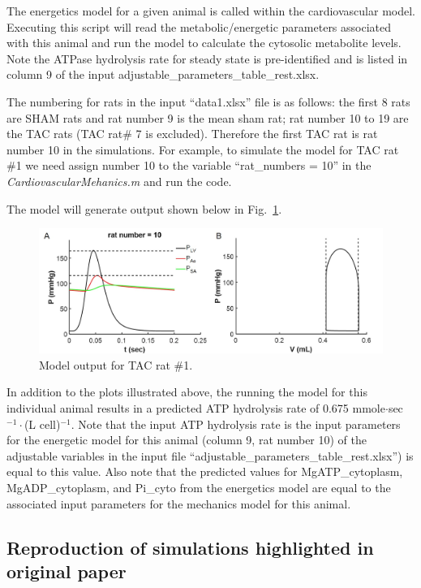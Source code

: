 \documentclass[fleqn,10pt]{physiome}
\begin{document}
The energetics model for a given animal is called within the cardiovascular model. Executing this script will read the metabolic/energetic parameters associated with this animal and run the model to calculate the cytosolic metabolite levels. Note the ATPase hydrolysis rate for steady state is pre-identified and is listed in column 9 of the input adjustable\_parameters\_table\_rest.xlsx. 

The numbering for rats in the input ``data1.xlsx'' file is as follows: the first 8 rats are SHAM rats and rat number 9 is the mean sham rat; rat number 10 to 19 are the TAC rats (TAC rat\# 7 is excluded). Therefore the first TAC rat is rat number 10 in the simulations. For example, to simulate the model for TAC rat \#1 we need assign number 10 to the variable ``rat\_numbers = 10'' in the {\em CardiovascularMehanics.m} and run the code. 

The model will generate output shown below in Fig.~\ref{fig:output}. 

\begin{figure}[ht]\centering
\includegraphics[width=1.0\linewidth]{FigS4.jpg}
\caption{Model output for TAC rat \#1.}\label{fig:output}
\end{figure}

In addition to the plots illustrated above, the running the model for this individual animal results in a predicted ATP hydrolysis rate of 0.675 mmole$\cdot$sec$^{-1}\cdot$(L cell)$^{-1}$. Note that the input ATP hydrolysis rate is the input parameters for the energetic model for this animal (column 9, rat number 10) of the adjustable variables in the input file ``adjustable\_parameters\_table\_rest.xlsx'') is equal to this value. Also note that the predicted values for MgATP\_cytoplasm, MgADP\_cytoplasm, and Pi\_cyto from the energetics model are equal to the associated input parameters for the mechanics model for this animal. 

\subsection{Reproduction of simulations highlighted in original paper}
\end{document}
